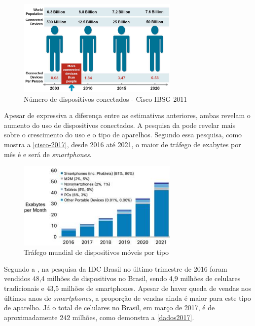 \begin{figure}[htb]
  \caption{\label{cisco2011}Número de dispositivos conectados - Cisco IBSG 2011}
  \begin{center}
    \includegraphics[width=0.70\textwidth]{img/cisco-2011.png}
  \end{center}
\end{figure}

Apesar de expressiva a diferença entre as estimativas anteriores, ambas revelam o aumento do uso de dispositivos conectados.
A pesquisa da  pode revelar mais sobre o crescimento do uso e o tipo de aparelhos. Segundo essa pesquisa,
como mostra a \autoref{cisco-2017}, desde
2016 até 2021, o maior de tráfego de exabytes por mês é e será de \emph{smartphones}.

\begin{figure}[htb]
  \caption{\label{cisco-2017}Tráfego mundial de dispositivos móveis por tipo}
  \begin{center}
    \includegraphics[width=0.70\textwidth]{img/cisco-2017.png}
  \end{center}
\end{figure}

Segundo a , na pesquisa da IDC Brasil
no último trimestre de 2016 foram vendidos 48,4 milhões de dispositivos no Brasil, sendo 4,9 milhões de celulares tradicionais e 43,5
milhões de smartphones. Apesar
de haver queda de vendas nos últimos anos de \emph{smartphones}, a proporção de vendas ainda é maior para este tipo de aparelho. Já o total
de celulares no Brasil, em março de 2017, é de aproximadamente 242 milhões, como demonstra a \autoref{dados2017}.

